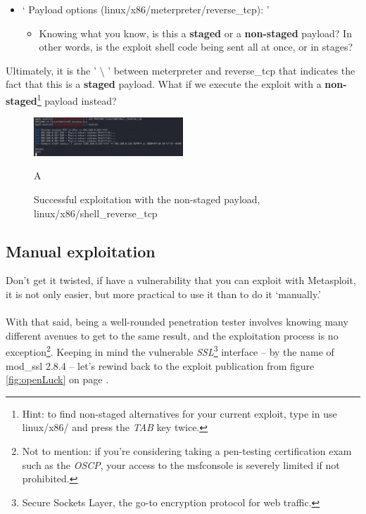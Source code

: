 \documentclass[a4paper,11pt]{article}
\renewcommand{\tt}[2][tt]{\textcolor{#1}{\ttfamily #2}}%
\begin{document}
\begin{itemize}
    \item ` \tt{Payload options (linux/x86/meterpreter/reverse\_tcp):} '
    \begin{itemize}
        \item Knowing what you know, is this a {\bfseries staged} or a {\bfseries non-staged} payload? In other words, is the exploit shell code being sent all at once, or in stages?
    \end{itemize}
\end{itemize}

Ultimately, it is the ' \tt{\textbackslash} ' between \tt{meterpreter} and \tt{reverse\_tcp} that indicates the fact that this is a {\bfseries staged} payload. What if we execute the exploit with a {\bfseries non-staged}\footnote[2]{Hint: to find non-staged alternatives for your current exploit, type in \tt{use linux/x86/} and press the \textit{TAB} key twice.} payload instead?

\begin{figure}[h]
    \centering
    \includegraphics[width=0.5\textwidth]{images/newtrans2openpayload.png}
    \caption{Successful exploitation with the non-staged payload, \tt{linux/x86/shell\_reverse\_tcp}}A
    \label{fig:nonstaged-modssl}
\end{figure}
\pagebreak

\subsection{Manual exploitation}

Don't get it twisted, if have a vulnerability that you can exploit with Metasploit, it is not only easier, but more practical to use it than to do it `manually.'
\\
\\
With that said, being a well-rounded penetration tester involves knowing many different avenues to get to the same result, and the exploitation process is no exception\footnote[2]{Not to mention: if you're considering taking a pen-testing certification exam such as the \textit{OSCP}, your access to the \tt{msfconsole} is severely limited if not prohibited.}. Keeping in mind the vulnerable \textit{SSL}\footnote[1]{Secure Sockets Layer, the go-to encryption protocol for web traffic.} interface -- by the name of \tt{mod\_ssl 2.8.4} -- let's rewind back to the exploit publication from figure \ref{fig:openLuck} on page \pageref{fig:openLuck}.
\end{document}
